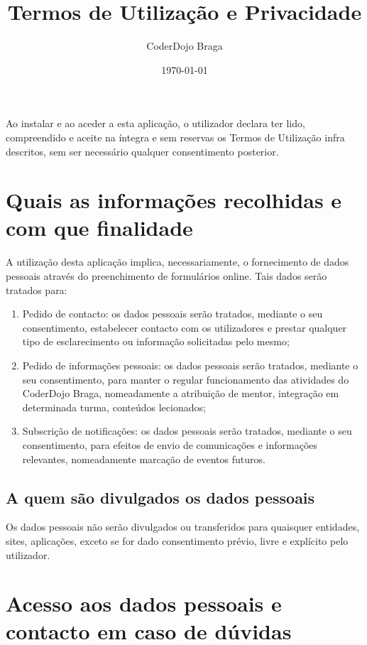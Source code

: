 \documentclass[11pt]{article}
\title{Termos de Utilização e Privacidade}
\author{CoderDojo Braga}
\date{\today}
\begin{document}
\maketitle

Ao instalar e ao aceder a esta aplicação, o utilizador declara ter lido,
compreendido e aceite na íntegra e sem reservas os Termos de
Utilização infra descritos, sem ser necessário qualquer consentimento
posterior.

\section{Quais as informações recolhidas e com que finalidade}

A utilização desta aplicação implica, necessariamente, o fornecimento
de dados pessoais através do preenchimento de formulários online.
Tais dados serão tratados para:

\begin{enumerate}
    \item Pedido de contacto: os dados pessoais serão tratados,
mediante o seu consentimento, estabelecer contacto com os
utilizadores e prestar qualquer tipo de esclarecimento ou
informação solicitadas pelo mesmo;

    \item Pedido de informações pessoais: os dados pessoais
serão tratados, mediante o seu consentimento, para manter
o regular funcionamento das atividades do CoderDojo Braga,
nomeadamente a atribuição de mentor, integração em
determinada turma, conteúdos lecionados;

    \item Subscrição de notificações: os dados pessoais serão
tratados, mediante o seu consentimento, para efeitos de
envio de comunicações e informações relevantes,
nomeadamente marcação de eventos futuros.
\end{enumerate}

\subsection{A quem são divulgados os dados pessoais}
Os dados pessoais não serão divulgados ou transferidos para
quaisquer entidades, sites, aplicações, exceto se for dado
consentimento prévio, livre e explícito pelo utilizador.

\section{Acesso aos dados pessoais e contacto em caso de
dúvidas}
\end{document}
